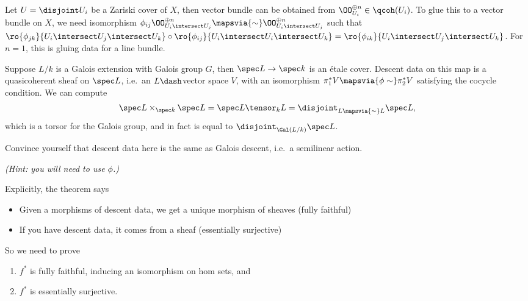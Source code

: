 \begin{example}[?]

Let \(U = \disjoint U_i\) be a Zariski cover of \(X\), then vector
bundle can be obtained from \(\OO_{U_i}^{\oplus n}\in \qcoh(U_i)\). To
glue this to a vector bundle on \(X\), we need isomorphism
\(\phi_{ij} \OO_{U_i\intersect U_j}^{\oplus n} \mapsvia{\sim } \OO_{U_i\intersect U_j}^{\oplus n}\)
such that
\(\ro{\phi_{jk}}{U_i \intersect U_j \intersect U_k} \circ \ro{\phi_{ij}}{U_i \intersect U_i \intersect U_k} = \ro{\phi_{ik}}{U_i\intersect U_j \intersect U_k}\).
For \(n=1\), this is gluing data for a line bundle.

\end{example}

\begin{example}[?]

Suppose \(L/k\) is a Galois extension with Galois group \(G\), then
\(\spec L \to \spec k\) is an étale cover. Descent data on this map is a
quasicoherent sheaf on \(\spec L\), i.e.~an \(L\dash\)vector space
\(V\), with an isomorphism \(\pi_1^* V \mapsvia{\phi \sim}\pi_2^* V\)
satisfying the cocycle condition. We can compute
\begin{align*}
\spec L \times_{\spec k} \spec L = \spec L\tensor_k L = \disjoint_{L\mapsvia{\sim} L} \spec L
,\end{align*} which is a torsor for the Galois group, and in fact is
equal to \(\disjoint_{\Gal(L/k)} \spec L\).

\end{example}

\begin{exercise}[?]

Convince yourself that descent data here is the same as Galois descent,
i.e.~a semilinear action.

\emph{(Hint: you will need to use \(\phi\).)}

\end{exercise}

Explicitly, the theorem says

\begin{itemize}
\item
  Given a morphisms of descent data, we get a unique morphism of sheaves
  (fully faithful)
\item
  If you have descent data, it comes from a sheaf (essentially
  surjective)
\end{itemize}

So we need to prove

\begin{enumerate}
\def\labelenumi{\arabic{enumi}.}
\item
  \(f^*\) is fully faithful, inducing an isomorphism on hom sets, and
\item
  \(f^*\) is essentially surjective.
\end{enumerate}

